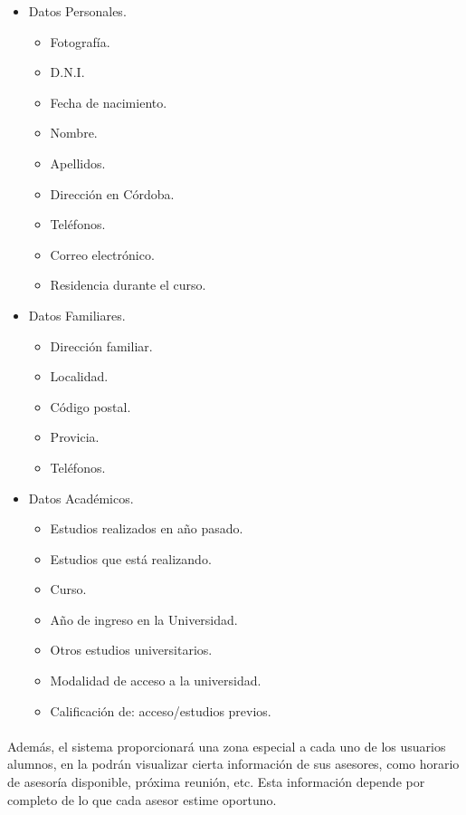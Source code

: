       \begin{itemize}
         \item Datos Personales.
         \begin{itemize}
            \item Fotografía.
            \item D.N.I.
            \item Fecha de nacimiento.
            \item Nombre.
            \item Apellidos.
            \item Dirección en Córdoba.
            \item Teléfonos.
            \item Correo electrónico.
            \item Residencia durante el curso.
         \end{itemize}
         \item Datos Familiares.
         \begin{itemize}
            \item Dirección familiar.
            \item Localidad.
            \item Código postal.
            \item Provicia.
            \item Teléfonos.
         \end{itemize}
         \item Datos Académicos.
         \begin{itemize}
            \item Estudios realizados en año pasado.
            \item Estudios que está realizando.
            \item Curso.
            \item Año de ingreso en la Universidad.
            \item Otros estudios universitarios.
            \item Modalidad de acceso a la universidad.
            \item Calificación de: acceso/estudios previos.
         \end{itemize}
      \end{itemize}

      \paragraph{}Además, el sistema proporcionará una zona especial
      a cada uno de los usuarios alumnos, en la podrán visualizar cierta
      información de sus asesores, como horario de asesoría disponible, próxima
      reunión, etc. Esta información depende por completo de lo que cada asesor
      estime oportuno.

